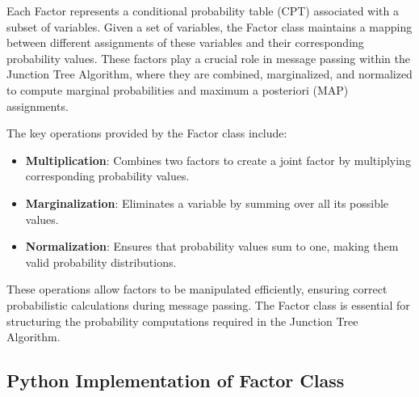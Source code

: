 Each Factor represents a conditional probability table (CPT) associated with a subset of variables. Given a set of variables, the Factor class maintains a mapping between different assignments of these variables and their corresponding probability values. These factors play a crucial role in message passing within the Junction Tree Algorithm, where they are combined, marginalized, and normalized to compute marginal probabilities and maximum a posteriori (MAP) assignments.

The key operations provided by the Factor class include:

\begin{itemize}
    \item \textbf{Multiplication}: Combines two factors to create a joint factor by multiplying corresponding probability values.
    \item \textbf{Marginalization}: Eliminates a variable by summing over all its possible values.
    \item \textbf{Normalization}: Ensures that probability values sum to one, making them valid probability distributions.

\end{itemize}

These operations allow factors to be manipulated efficiently, ensuring correct probabilistic calculations during message passing. The Factor class is essential for structuring the probability computations required in the Junction Tree Algorithm.

\subsection{Python Implementation of Factor Class}

